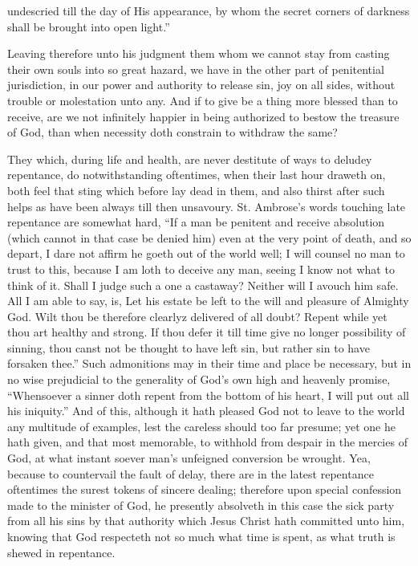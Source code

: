 undescried till the day of His appearance, by whom the secret corners of darkness shall be brought into open light.”

Leaving therefore unto his judgment them whom we cannot stay from casting their own souls into so great hazard, we have in the other part of penitential jurisdiction, in our power and authority to release sin, joy on all sides, without trouble or molestation unto any. And if to give be a thing more blessed than to receive, are we not infinitely happier in being authorized to bestow the treasure of God, than when necessity doth constrain to withdraw the same?

They which, during life and health, are never destitute of ways to deludey repentance, do notwithstanding oftentimes, when their last hour draweth on, both feel that sting which before lay dead in them, and also thirst after such helps as  have been always till then unsavoury. St. Ambrose’s words touching late repentance are somewhat hard, “If a man be penitent and receive absolution (which cannot in that case be denied him) even at the very point of death, and so depart, I dare not affirm he goeth out of the world well; I will counsel no man to trust to this, because I am loth to deceive any man, seeing I know not what to think of it. Shall I judge such a one a castaway? Neither will I avouch him safe. All I am able to say, is, Let his estate be left to the will and pleasure of Almighty God. Wilt thou be therefore clearlyz delivered of all doubt? Repent while yet thou art healthy and strong. If thou defer it till time give no longer possibility of sinning, thou canst not be thought to have left sin, but rather sin to have forsaken thee.” Such admonitions may in their time and place be necessary, but in no wise prejudicial to the generality of God’s own high and heavenly promise, “Whensoever a sinner doth repent from the bottom of his heart, I will put out all his iniquity.” And of this, although it hath pleased God not to leave to the world any multitude of examples, lest the careless should too far presume; yet one he hath given, and that most memorable, to withhold from despair in the mercies of God, at what instant soever man’s unfeigned conversion be wrought. Yea, because to countervail the fault of delay, there are in the latest repentance oftentimes the surest tokens of sincere dealing; therefore upon special confession made to the minister of God, he presently absolveth in this case the sick party from all his sins by that authority which Jesus Christ hath committed unto him, knowing that God respecteth  not so much what time is spent, as what truth is shewed in repentance.

